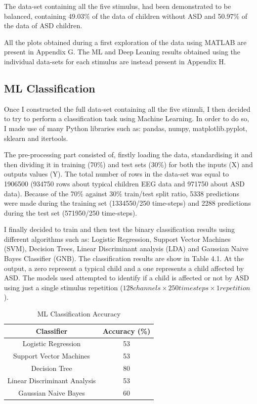 The data-set containing all the five stimulus, had been demonstrated to be balanced, containing 49.03\% of the data of children without ASD and 50.97\% of the data of ASD children. 

All the plots obtained during a first exploration of the data using MATLAB are present in Appendix G. The ML and Deep Leaning results obtained using the individual data-sets for each stimulus are instead present in Appendix H.  

\subsection{ML Classification}
Once I constructed the full data-set containing all the five stimuli, I then decided to try to perform a classification task using Machine Learning. In order to do so, I made use of many Python libraries such as: pandas, numpy, matplotlib.pyplot, sklearn and itertools.

The pre-processing part consisted of, firstly loading the data, standardising it and then dividing it in training (70\%) and test sets (30\%) for both the inputs (X) and outputs values (Y). The total number of rows in the data-set was equal to 1906500 (934750 rows about typical children EEG data and 971750 about ASD data). Because of the 70\% against 30\% train/test split ratio, 5338 predictions were made during the training set (1334550/250 time-steps) and 2288 predictions during the test set (571950/250 time-steps).

I finally decided to train and then test the binary classification results using different algorithms such as: Logistic Regression, Support Vector Machines (SVM), Decision Trees, Linear Discriminant analysis (LDA) and Gaussian Naive Bayes Classifier (GNB). The classification results are show in Table 4.1. At the output, a zero represent a typical child and a one represents a child affected by ASD. The models used attempted to identify if a child is affected or not by ASD using just a single stimulus repetition ($128 channels \times250 timesteps \times1 repetition$).

{
\begin{table}[h!]
\centering
\begin{tabular}{|c|c|}
\hline
Classifier &Accuracy (\%) \\
\hline
Logistic Regression & 53  \\
Support Vector Machines & 53  \\
Decision Tree & 80  \\
Linear Discriminant Analysis & 53 \\
Gaussian Naive Bayes & 60 \\
\hline
\end{tabular}
\caption{ML Classification Accuracy}
\label{table:1}
\end{table}
}

